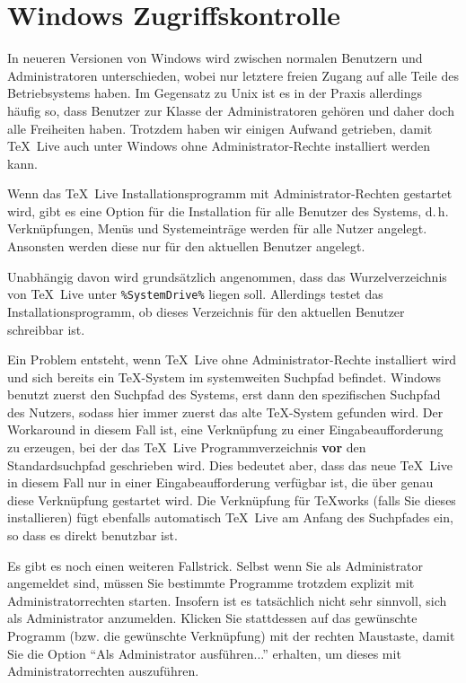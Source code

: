 \documentclass[12pt,ngerman,a4paper,fullparskip]{report}
\newcommand{\TL}{\TeX\ Live\xspace}
\begin{document}
\section{Windows Zugriffskontrolle}
\label{sec:winpermissions}

In neueren Versionen von Windows wird zwischen normalen Benutzern und Administratoren unterschieden, wobei nur letztere freien Zugang auf alle Teile des Betriebsystems haben. 
Im Gegensatz zu Unix ist es in der Praxis allerdings häufig so, dass Benutzer zur Klasse der Administratoren
gehören und daher doch alle Freiheiten haben. 
Trotzdem haben wir einigen Aufwand getrieben, damit \TL auch unter Windows ohne Administrator-Rechte
installiert werden kann.

Wenn das \TL Installationsprogramm mit Administrator-Rechten gestartet wird, gibt es eine Option für die Installation für alle Benutzer des Systems, d.\,h. Verknüpfungen, Menüs und Systemeinträge werden für alle Nutzer angelegt. 
Ansonsten werden diese nur für den aktuellen Benutzer angelegt.

Unabhängig davon wird grundsätzlich angenommen, dass das Wurzelverzeichnis
von \TL unter \verb|%SystemDrive%| liegen soll. Allerdings testet das
Installationsprogramm, ob dieses Verzeichnis für den aktuellen Benutzer
schreibbar ist.

Ein Problem entsteht, wenn \TL ohne Administrator-Rechte installiert
wird und sich bereits ein \TeX{}-System im systemweiten Suchpfad
befindet. Windows benutzt zuerst den Suchpfad des Systems, erst dann
den spezifischen Suchpfad des Nutzers, sodass hier immer zuerst
das alte \TeX-System gefunden wird. Der Workaround in diesem Fall ist, eine Verknüpfung zu einer Eingabeaufforderung zu erzeugen, bei der das \TL Programmverzeichnis \textbf{vor} den Standard\-such\-pfad
geschrieben wird. Dies bedeutet aber, dass das neue \TL in diesem Fall nur in einer
Eingabeaufforderung verfügbar ist, die über genau diese Verknüpfung gestartet
wird. Die Verknüpfung für \TeX{}works (falls Sie dieses installieren)
fügt ebenfalls automatisch \TL{} am Anfang des Suchpfades ein, so dass
es direkt benutzbar ist.

Es gibt es noch einen weiteren Fallstrick. 
Selbst wenn Sie als Administrator angemeldet sind, müssen Sie bestimmte Programme trotzdem explizit
mit Administratorrechten starten. 
Insofern ist es tatsächlich nicht sehr sinnvoll, sich als Administrator anzumelden. 
Klicken Sie stattdessen auf das gewünschte Programm (bzw. die gewünschte Verknüpfung) mit der
rechten Maustaste, damit Sie die Option \enquote{Als Administrator ausführen...} erhalten, um dieses mit Administratorrechten auszuführen.
\end{document}
